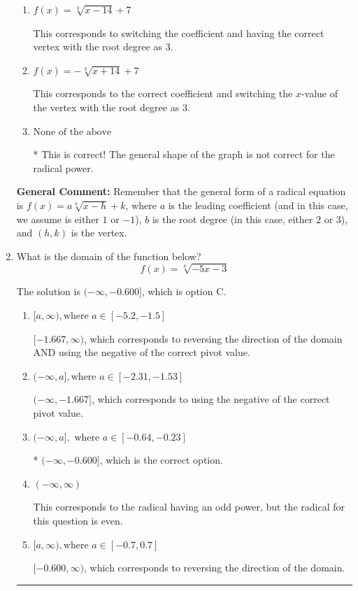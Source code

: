\documentclass{extbook}[14pt]
\newcommand{\litem}[1]{\item #1

\rule{\textwidth}{0.4pt}}
\begin{document}
\begin{enumerate}
{\begin{enumerate}[label=\Alph*.]
This corresponds to switching the coefficient AND switching the $x$-value of the vertex with the root degree as $3$.
\item \( f(x) = \sqrt[3]{x - 14} + 7 \)

This corresponds to switching the coefficient and having the correct vertex with the root degree as $3$.
\item \( f(x) = - \sqrt[3]{x + 14} + 7 \)

This corresponds to the correct coefficient and switching the $x$-value of the vertex with the root degree as $3$.
\item \( \text{None of the above} \)

* This is correct! The general shape of the graph is not correct for the radical power.
\end{enumerate}

\textbf{General Comment:} Remember that the general form of a radical equation is $ f(x) = a \sqrt[b]{x - h} + k$, where $a$ is the leading coefficient (and in this case, we assume is either $1$ or $-1$), $b$ is the root degree (in this case, either $2$ or $3$), and $(h, k)$ is the vertex.
}
\litem{
What is the domain of the function below?
\[ f(x) = \sqrt[8]{-5 x - 3} \]

The solution is \( (-\infty, -0.600] \), which is option C.\begin{enumerate}[label=\Alph*.]
\item \( [a, \infty), \text{where } a \in [-5.2, -1.5] \)

$[-1.667, \infty)$, which corresponds to reversing the direction of the domain AND using the negative of the correct pivot value.
\item \( (-\infty, a], \text{where } a \in [-2.31, -1.53] \)

$(-\infty, -1.667]$, which corresponds to using the negative of the correct pivot value.
\item \( (-\infty, a], \text{ where } a \in [-0.64, -0.23] \)

* $(-\infty, -0.600]$, which is the correct option.
\item \( (-\infty, \infty) \)

This corresponds to the radical having an odd power, but the radical for this question is even.
\item \( [a, \infty), \text{where } a \in [-0.7, 0.7] \)

 $[-0.600, \infty)$, which corresponds to reversing the direction of the domain.
\end{enumerate}

}
\end{enumerate}
\end{document}
